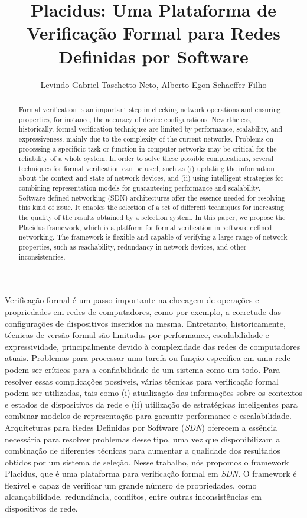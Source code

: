 \documentclass[12pt]{article}
\title{Placidus: Uma Plataforma de Verificação Formal para Redes Definidas por Software}
\author{Levindo Gabriel Taschetto Neto\inst{1}, Alberto Egon Schaeffer-Filho\inst{1}}
\begin{document}
 

\maketitle

\begin{abstract} %
Formal verification is an important step in checking network operations and ensuring properties, for instance, the accuracy of device configurations. Nevertheless, historically, formal verification techniques are limited by performance, scalability, and expressiveness, mainly due to the complexity of the current networks.
Problems on processing a specificic task or function in computer networks may be critical for the reliability of a whole system.
In order to solve these possible complications, several techniques for formal verification can be used, such as (i) updating the information about the context and state of network devices, and (ii) using intelligent strategies for combining representation models for guaranteeing performance and scalability.
Software defined networking (SDN) architectures offer the essence needed for resolving this kind of issue.
It enables the selection of a set of different techniques for increasing the quality of the results obtained by a selection system.
In this paper, we propose the Placidus framework, which is a platform for formal verification in software defined networking.
The framework is flexible and capable of verifying a large range of network properties, such as reachability, redundancy in network devices, and other inconsistencies.
\end{abstract}
     
\begin{resumo}  %
Verificação formal é um passo importante na checagem de operações e propriedades em redes de computadores, como por exemplo, a corretude das configurações de dispositivos inseridos na mesma. Entretanto, historicamente, técnicas de versão formal são limitadas por performance, escalabilidade e expressividade, principalmente devido à complexidade das redes de computadores atuais.
Problemas para processar uma tarefa ou função específica em uma rede podem ser críticos para a confiabilidade de um sistema como um todo.
Para resolver essas complicações possíveis, várias técnicas para verificação formal podem ser utilizadas, tais como (i) atualização das informações sobre os contextos e estados de dispositivos da rede e (ii) utilização de estratégicas inteligentes para combinar modelos de representação para garantir performance e escalabilidade.
Arquiteturas para Redes Definidas por Software (\textit{SDN}) oferecem a essência necessária para resolver problemas desse tipo, uma vez que disponibilizam a combinação de diferentes técnicas para aumentar a qualidade dos resultados obtidos por um sistema de seleção.
Nesse trabalho, nós propomos o framework Placidus, que é uma plataforma para verificação formal em \textit{SDN}.
O framework é flexível e capaz de verificar um grande número de propriedades, como alcançabilidade, redundância, conflitos, entre outras inconsistências em dispositivos de rede.

\end{resumo}
\end{document}
